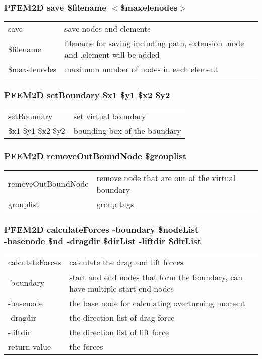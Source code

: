 \documentclass[12pt]{article}
\begin{document}
\subsubsection*{PFEM2D save \$filename $<$\$maxelenodes$>$}
\begin{tabular}{ll}
save & save nodes and elements\\
\$filename & filename for saving including path, extension .node and .element will be added\\
\$maxelenodes & maximum number of nodes in each element
\end{tabular}

\subsubsection*{PFEM2D setBoundary \$x1 \$y1 \$x2 \$y2}
\begin{tabular}{ll}
setBoundary & set virtual boundary\\
\$x1 \$y1 \$x2 \$y2 & bounding box of the boundary
\end{tabular}

\subsubsection*{PFEM2D removeOutBoundNode \$grouplist}
\begin{tabular}{ll}
removeOutBoundNode & remove node that are out of the virtual boundary\\
grouplist & group tags
\end{tabular}

\subsubsection*{PFEM2D calculateForces -boundary \$nodeList \\
-basenode \$nd -dragdir \$dirList -liftdir \$dirList}
\begin{tabular}{ll}
calculateForces & calculate the drag and lift forces\\
-boundary & start and end nodes that form the boundary, can have multiple start-end nodes\\
-basenode & the base node for calculating overturning moment\\
-dragdir & the direction list of drag force\\
-liftdir & the direction list of lift force\\
return value & the forces
\end{tabular}
\end{document}
